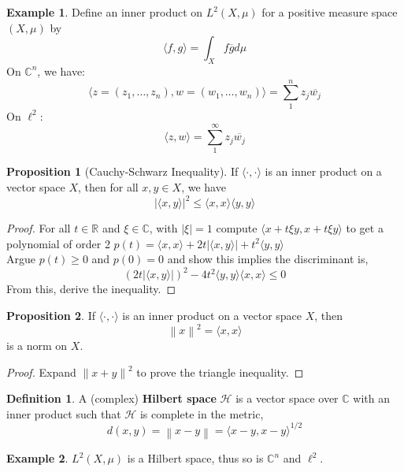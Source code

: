 \documentclass{article}
\theoremstyle{definition}
\newtheorem{example}{Example}
\newtheorem*{defn}{Definition}
\newtheorem{proposition}{Proposition}
\newcommand{\norm}[1]{\left\lVert#1\right\rVert}
\begin{document}
    \begin{example}
        Define an inner product on $L^2(X,\mu)$ for a positive measure space $(X,\mu)$ by
        \[ \langle f,g\rangle = \int_X f\overline{g}d\mu \]
        On $\mathbb{C}^n$, we have:
        \[ \langle z = (z_1,\hdots,z_n),w = (w_1,\hdots,w_n)\rangle = \sum_1^n z_j\overline{w_j} \]
        On $\ell^2$:
        \[ \langle z,w\rangle = \sum_1^{\infty} z_j\overline{w_j} \]
    \end{example}

    \begin{proposition}[Cauchy-Schwarz Inequality]
        If $\langle \cdot,\cdot\rangle$ is an inner product on a vector space $X$, then for all $x,y\in X$, we have
        \[ |\langle x,y\rangle|^2 \leq \langle x,x\rangle\langle y,y\rangle \]
    \end{proposition}

    \begin{proof}
        For all $t\in\mathbb{R}$ and $\xi\in\mathbb{C}$, with $|\xi|=1$ compute 
        $\langle x+t\xi y,x+t\xi y\rangle$ to get a polynomial of order 2
        $p(t) = \langle x,x\rangle + 2t|\langle x,y\rangle| + t^2\langle y,y\rangle$\\

        Argue $p(t)\geq 0$ and $p(0) = 0$ and show this implies the discriminant is,
        \[ (2t|\langle x,y\rangle|)^2 - 4t^2\langle y,y\rangle\langle x,x\rangle \leq 0 \]
        From this, derive the inequality.
    \end{proof}

    \begin{proposition}
        If $\langle \cdot,\cdot\rangle$ is an inner product on a vector space $X$, then
        \[ \norm{x}^2 = \langle x,x\rangle \]
        is a norm on $X$.
    \end{proposition}
    \begin{proof}
        Expand $\norm{x+y}^2$ to prove the triangle inequality.
    \end{proof}

    \begin{defn}
        A (complex) \textbf{Hilbert space} $\mathcal{H}$ is a vector space over $\mathbb{C}$ with an inner product such that
        $\mathcal{H}$ is complete in the metric,
        \[ d(x,y) = \norm{x-y} = \langle x-y,x-y\rangle^{1/2} \]
    \end{defn}

    \begin{example}
        $L^2(X,\mu)$ is a Hilbert space, thus so is $\mathbb{C}^n$ and $\ell^2$.
    \end{example}
\end{document}
